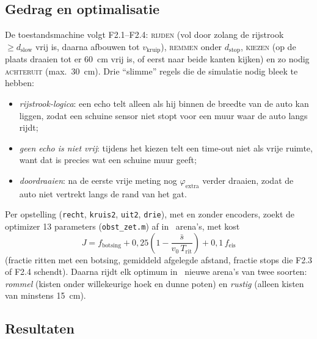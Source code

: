 \documentclass[10pt,a4paper]{article}
\begin{document}
\subsection{Gedrag en optimalisatie}
De toestandsmachine volgt F2.1--F2.4: \textsc{rijden} (vol door zolang de rijstrook $\ge d_{\text{slow}}$
vrij is, daarna afbouwen tot $v_{\text{kruip}}$), \textsc{remmen} onder $d_{\text{stop}}$,
\textsc{kiezen} (op de plaats draaien tot er 60~cm vrij is, of eerst naar beide kanten kijken) en zo
nodig \textsc{achteruit} (max.\ 30~cm). Drie ``slimme'' regels die de simulatie nodig bleek te hebben:
\begin{itemize}
\item \emph{rijstrook-logica}: een echo telt alleen als hij binnen de breedte van de auto kan liggen,
  zodat een schuine sensor niet stopt voor een muur waar de auto langs rijdt;
\item \emph{geen echo is niet vrij}: tijdens het kiezen telt een time-out niet als vrije ruimte, want dat
  is precies wat een schuine muur geeft;
\item \emph{doordraaien}: na de eerste vrije meting nog $\varphi_{\text{extra}}$ verder draaien, zodat de
  auto niet vertrekt langs de rand van het gat.
\end{itemize}
Per opstelling (\texttt{recht}, \texttt{kruis2}, \texttt{uit2}, \texttt{drie}), met en zonder encoders,
zoekt de optimizer 13 parameters (\texttt{obst\_zet.m}) af in \ObstNtrain\ arena's, met kost
\begin{equation}
J = f_{\text{botsing}} + 0{,}25\left(1 - \frac{\bar s}{v_0\, T_{\text{rit}}}\right) + 0{,}1\, f_{\text{eis}}
\label{eq:jobst}
\end{equation}
(fractie ritten met een botsing, gemiddeld afgelegde afstand, fractie stops die F2.3 of F2.4 schendt).
Daarna rijdt elk optimum in \ObstNval\ nieuwe arena's van twee soorten: \emph{rommel} (kisten onder
willekeurige hoek en dunne poten) en \emph{rustig} (alleen kisten van minstens 15~cm).

\subsection{Resultaten}
\begin{table}[H]
\centering\footnotesize

\caption{Validatie per opstelling, elk met eigen geoptimaliseerd gedrag. ``Test gehaald'' is de kans
dat minstens 2 van 3 ritten botsingsvrij zijn: $3p^2 - 2p^3$.}
\label{tab:obst}
\end{table}
\end{document}
